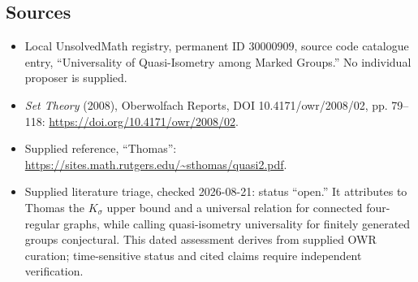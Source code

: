 \documentclass[11pt]{article}
\begin{document}
\subsection{Sources}
\begin{itemize}
\item Local UnsolvedMath registry, permanent ID \(30000909\), source code catalogue entry, ``Universality of Quasi-Isometry among Marked Groups.'' No individual proposer is supplied.
\item \emph{Set Theory} (2008), Oberwolfach Reports, DOI 10.4171/owr/2008/02, pp. 79--118: \url{https://doi.org/10.4171/owr/2008/02}.
\item Supplied reference, ``Thomas'': \url{https://sites.math.rutgers.edu/~sthomas/quasi2.pdf}.
\item Supplied literature triage, checked 2026-08-21: status ``open.'' It attributes to Thomas the \(K_\sigma\) upper bound and a universal relation for connected four-regular graphs, while calling quasi-isometry universality for finitely generated groups conjectural. This dated assessment derives from supplied OWR curation; time-sensitive status and cited claims require independent verification.
\end{itemize}
\end{document}

